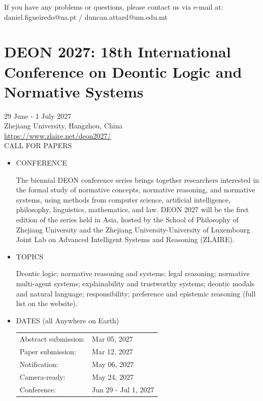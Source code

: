 \documentclass[prodmode,acmtecs]{acmsmall} %
\begin{document}
\begin{itemize}
  If you have any problems or questions, please contact us via e-mail at: daniel.figueiredo@ua.pt / duncan.attard@um.edu.mt 
 
\end{itemize}\section{DEON 2027: 18th International Conference on Deontic Logic and Normative Systems}\label{DEON2027}  29 June - 1 July 2027\\ 
  Zhejiang University, Hangzhou, China\\ 
  \href{https://www.zlaire.net/deon2027/}{https://www.zlaire.net/deon2027/}\\ 
CALL FOR PAPERS 

\begin{itemize}\item  CONFERENCE 
 
  The biennial DEON conference series brings together researchers interested in the formal study of normative concepts, normative reasoning, and normative systems, using methods from computer science, artificial intelligence, philosophy, linguistics, mathematics, and law. DEON 2027 will be the first edition of the series held in Asia, hosted by the School of Philosophy of Zhejiang University and the Zhejiang University-University of Luxembourg Joint Lab on Advanced Intelligent Systems and Reasoning (ZLAIRE). 
 
\item  TOPICS 
 
  Deontic logic; normative reasoning and systems; legal reasoning; normative multi-agent systems; explainability and trustworthy systems; deontic modals and natural language; responsibility; preference and epistemic reasoning (full list on the website). 
 
\item  DATES (all Anywhere on Earth) 
 
\begin{tabulary}{\linewidth}{LL}Abstract submission:  & Mar 05, 2027 \\
Paper submission:  & Mar 12, 2027 \\
Notification:  & May 06, 2027 \\
Camera-ready:  & May 24, 2027 \\
Conference:  & Jun 29 - Jul 1, 2027 \\
\end{tabulary}
 

\end{itemize}
\end{document}
